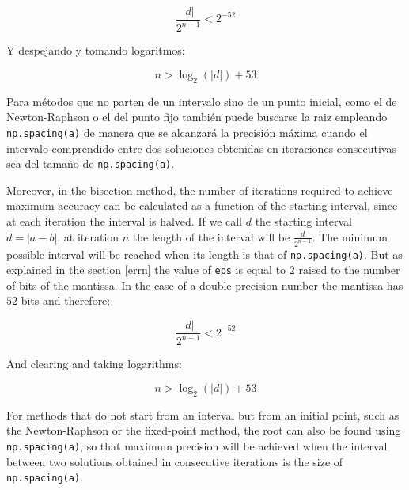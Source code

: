 \begin{paracol}{2}
\begin{equation*}
\frac{\vert d \vert}{2^{n-1}}<2^{-52} 
\end{equation*}

Y despejando y tomando logaritmos:

\begin{equation*}
n > \log_{2}(\vert d \vert)+53
\end{equation*}

Para métodos que no parten de un intervalo sino de un punto inicial, como el de Newton-Raphson o el del punto fijo también puede buscarse la raiz empleando \texttt{np.spacing(a)} de manera que se alcanzará la precisión máxima cuando el intervalo comprendido entre dos soluciones obtenidas en iteraciones consecutivas sea del tamaño de \texttt{np.spacing(a)}. 

\switchcolumn
Moreover, in the bisection method, the number of iterations required to achieve maximum accuracy can be calculated as a function of the starting interval, since at each iteration the interval is halved. If we call $d$ the starting interval $d=\vert a-b \vert$, at iteration $n$ the length of the interval will be $\frac{d}{2^{n-1}}$. The minimum possible interval will be reached when its length is that of \texttt{np.spacing(a)}. But as explained in the section \ref{errn} the value of \texttt{eps} is equal to $2$ raised to the number of bits of the mantissa. In the case of a double precision number the mantissa has $52$ bits and therefore:

\begin{equation*}
\frac{\vert d \vert}{2^{n-1}}<2^{-52} 
\end{equation*}

And clearing and taking logarithms:

\begin{equation*}
n > \log_{2}(\vert d \vert)+53
\end{equation*}

For methods that do not start from an interval but from an initial point, such as the Newton-Raphson or the fixed-point method, the root can also be found using \texttt{np.spacing(a)}, so that maximum precision will be achieved when the interval between two solutions obtained in consecutive iterations is the size of \texttt{np.spacing(a)}.
\end{paracol}



